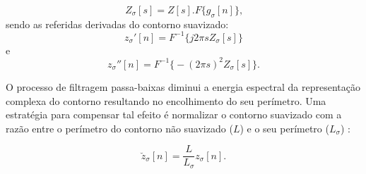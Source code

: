 \begin{equation}
Z_\sigma[s] = Z[s].F\big\{g_\sigma[n]\big\}\text{,}
\end{equation}
\noindent
 sendo as referidas derivadas do contorno suavizado:
\begin{equation}
z_\sigma'[n] = F^{-1}\big\{j2\pi s Z_\sigma[s]\big\}
\end{equation} e
\begin{equation}
z_\sigma''[n] = F^{-1}\big\{-(2\pi s)^2 Z_\sigma[s]\big\}\text{.}
\end{equation}

O processo de filtragem passa-baixas diminui a energia espectral da representação complexa do contorno resultando no encolhimento do seu perímetro. Uma estratégia para compensar tal efeito é normalizar o contorno suavizado com a razão entre o perímetro do contorno não suavizado ($L$) e o seu perímetro ($L_{\sigma}$) \cite{Cesar:1996,Costa:1997}:

\begin{equation}
\breve{z}_{\sigma}[n] = \frac{L}{L_{\sigma}}z_{\sigma}[n]\text{.}
\end{equation}


